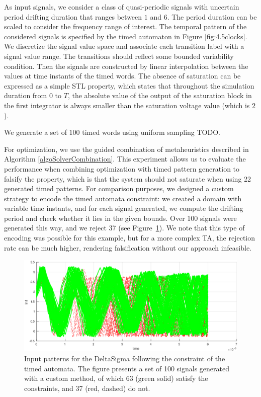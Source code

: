As input signals, we consider a class of quasi-periodic signals with uncertain period drifting duration that ranges between $1$ and $6$. The period duration can be scaled to consider the frequency range of interest. The temporal pattern of the considered signals is specified by the timed automaton in Figure \ref{fig:4.5clocks}. We discretize the signal value space and associate each transition label with a signal value range. The transitions should reflect some bounded variability condition. Then the signals are constructed by linear interpolation between the values at time instants of the timed words. The absence of saturation can be expressed as a simple STL property, which states that throughout the simulation duration from $0$ to $T$, the absolute value of the output of the saturation block in the first integrator is always smaller than the saturation voltage value (which is $2$).

We generate a set of $100$ timed words using uniform sampling \cite{} {\color{red}TODO}. 

For optimization, we use the guided  combination of metaheuristics described in Algorithm \ref{algoSolverCombination}.  
This experiment allows us to evaluate the performance when combining optimization with timed pattern generation to falsify the property, which is that the system should not saturate when using 22 generated timed patterns. For comparison purposes, we designed a custom strategy to encode the timed automata constraint: we created a domain with variable time instants, and for each signal generated, we compute the drifting period and check whether it lies in the given bounds. Over 100 signals were generated this way, and we reject 37 (see Figure~\ref{fig:reject}). We note that this type of encoding was possible for this example, but for a more complex TA, the rejection rate can be much higher, rendering falsification without our approach infeasible. 

\begin{figure}
  \centering
  \includegraphics[width=\textwidth]{inputs_reject.png}
  \caption{Input patterns for the DeltaSigma following the constraint of the timed automata. The figure presents a set of 100 signals generated with a custom method, of which 63 (green solid) satisfy the constraints, and 37 (red, dashed) do not.}
  \label{fig:reject}
\end{figure}

